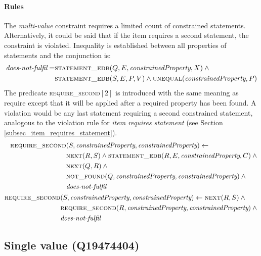 \documentclass[hyperref,bachelorofscience,fleqn]{cgvpub}
\begin{document}
\paragraph{Rules}
The \emph{multi-value} constraint requires a limited count of constrained statements. Alternatively, it could be said that if the item requires a second statement, the constraint is violated. Inequality is established between all properties of statements and the conjunction is:
\begin{equation}
\begin{split}
\emph{does-not-fulfil} = &\textsc{statement\_edb}(Q, E, \emph{constrainedProperty}, X) \wedge{} \\
&\textsc{statement\_edb}(S, E, P, V) \wedge \textsc{unequal}(\emph{constrainedProperty}, P)
\end{split}
\end{equation}
The predicate \textsc{require\_second}\([2]\) is introduced with the same meaning as require except that it will be applied after a required property has been found. A violation would be any last statement requiring a second constrained statement, analogous to the violation rule for \emph{item requires statement} (see Section \ref{subsec_item_requires_statement}).
\begin{align}
\begin{split}
\textsc{require\_second}&(S, \emph{constrainedProperty}, \emph{constrainedProperty}) \leftarrow \\
&\textsc{next}(R, S) \wedge \textsc{statement\_edb}(R, E, \emph{constrainedProperty}, C) \wedge{} \\
&\textsc{next}(Q, R) \wedge{} \\
&\textsc{not\_found}(Q, \emph{constrainedProperty}, \emph{constrainedProperty})  \wedge{} \\
&\emph{does-not-fulfil}
\end{split}\\
\begin{split}
\textsc{require\_second}&(S, \emph{constrainedProperty}, \emph{constrainedProperty}) \leftarrow \textsc{next}(R, S) \wedge{} \\
&\textsc{require\_second}(R, \emph{constrainedProperty}, \emph{constrainedProperty}) \wedge{} \\
&\emph{does-not-fulfil}
\end{split}
\end{align}

\subsection{Single value (Q19474404)}\label{subsec_single_value}
\end{document}
